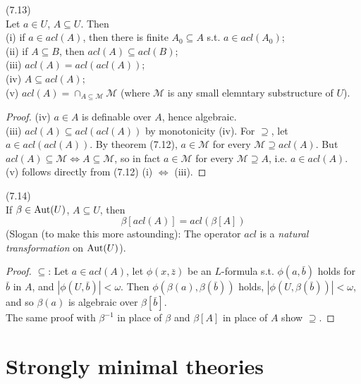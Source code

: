 \documentclass[a4paper]{article}
\begin{document}
\begin{prop} (7.13)\\
    Let $a \in U$, $A \subseteq U$. Then \\
    (i) if $a \in acl(A)$, then there is finite $A_0 \subseteq A$ s.t. $a \in acl(A_0)$;\\
    (ii) if $A \subseteq B$, then $acl(A) \subseteq acl(B)$;\\
    (iii) $acl(A) = acl(acl(A))$;\\
    (iv) $A \subseteq acl(A)$;\\
    (v) $acl(A) =\cap_{A \subseteq \mathcal{M}} \mathcal{M}$ (where $\mathcal{M}$ is any small elemntary substructure of $U$).
    \begin{proof}
        (iv) $a \in A$ is definable over $A$, hence algebraic.\\
        (iii) $acl(A) \subseteq acl(acl(A))$ by monotonicity (iv). For $\supseteq$, let $a \in acl(acl(A))$. By theorem (7.12), $a \in \mathcal{M}$ for every $\mathcal{M} \supseteq acl(A)$. But $acl(A) \subseteq \mathcal{M} \iff A \subseteq \mathcal{M}$, so in fact $a \in \mathcal{M}$ for every $\mathcal{M} \supseteq A$, i.e. $a \in acl(A)$.\\
        (v) follows directly from (7.12) (i) $\iff$ (iii).
    \end{proof}
\end{prop}

\begin{prop} (7.14)\\
    If $\beta \in \operatorname{Aut}(U)$, $A \subseteq U$, then 
    $$\beta[acl(A)] = acl(\beta[A])$$
    (Slogan (to make this more astounding): The operator $acl$ is a \emph{natural transformation} on $\operatorname{Aut}(U)$).
    \begin{proof}
        $\subseteq$: Let $a \in acl(A)$, let $\phi(x,\bar{z})$ be an $L$-formula s.t. $\phi(a,\bar{b})$ holds for $\bar{b}$ in $A$, and $|\phi(U,\bar{b})| < \omega$. Then $\phi(\beta(a),\beta(\bar{b}))$ holds, $|\phi(U,\beta(\bar{b}))| < \omega$, and so $\beta(a)$ is algebraic over $\beta[\bar{b}]$.\\
        The same proof with $\beta^{-1}$ in place of $\beta$ and $\beta[A]$ in place of $A$ show $\supseteq$.
    \end{proof}
\end{prop}

\newpage

\section{Strongly minimal theories}
\end{document}
